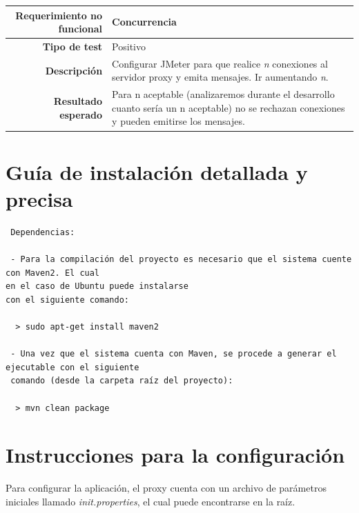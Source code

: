 \documentclass[a4paper,10pt]{article}
\begin{document}
\begin{center}
  \begin{tabular}{|r|p{12.5cm}|}
    \hline
    \textbf{Requerimiento no funcional}	& Concurrencia\\
    \hline
    \textbf{Tipo de test}	&	Positivo\\
    \hline
    \textbf{Descripción}	&	Configurar JMeter para que realice \textit{n} conexiones al servidor proxy y emita mensajes.
					Ir aumentando \textit{n}.\\
    \hline
    \textbf{Resultado esperado}	&	Para n aceptable (analizaremos durante el desarrollo cuanto sería un n aceptable) no se rechazan conexiones y pueden emitirse los mensajes.\\
    \hline   
  \end{tabular}
\end{center}

\section{Guía de instalación detallada y precisa}

\begin{verbatim}
 Dependencias:

 - Para la compilación del proyecto es necesario que el sistema cuente con Maven2. El cual 
en el caso de Ubuntu puede instalarse
con el siguiente comando:

  > sudo apt-get install maven2

 - Una vez que el sistema cuenta con Maven, se procede a generar el ejecutable con el siguiente
 comando (desde la carpeta raíz del proyecto):

  > mvn clean package
\end{verbatim}


\section{Instrucciones para la configuración}
Para configurar la aplicación, el proxy cuenta con un archivo de parámetros iniciales llamado \textit{init.properties}, el cual puede
encontrarse en la raíz.
\end{document}

